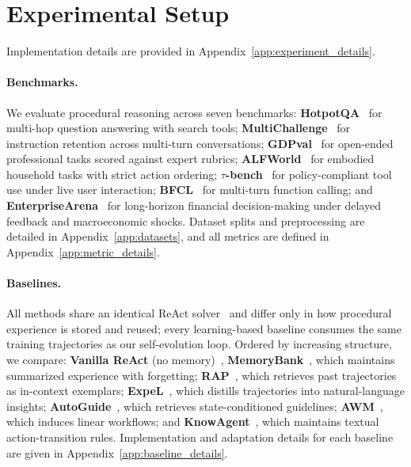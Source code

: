 \section{Experimental Setup}
\label{sec:experiments}

Implementation details are provided in Appendix~\ref{app:experiment_details}.

\paragraph{Benchmarks.} We evaluate procedural reasoning across seven benchmarks: \textbf{HotpotQA}~\citep{yang2018hotpotqa} for multi-hop question answering with search tools; \textbf{MultiChallenge}~\citep{deshpande2025multichallenge} for instruction retention across multi-turn conversations; \textbf{GDPval}~\citep{patwardhan2025gdpval} for open-ended professional tasks scored against expert rubrics; \textbf{ALFWorld}~\citep{shridharalfworld} for embodied household tasks with strict action ordering; \textbf{$\tau$-bench}~\citep{yao2024tau} for policy-compliant tool use under live user interaction; \textbf{BFCL}~\citep{patil2025berkeley} for multi-turn function calling; and \textbf{EnterpriseArena}~\citep{han2026can} for long-horizon financial decision-making under delayed feedback and macroeconomic shocks. Dataset splits and preprocessing are detailed in Appendix~\ref{app:datasets}, and all metrics are defined in Appendix~\ref{app:metric_details}.

\paragraph{Baselines.} All methods share an identical ReAct solver~\citep{yao2023react} and differ only in how procedural experience is stored and reused; every learning-based baseline consumes the same training trajectories as our self-evolution loop. Ordered by increasing structure, we compare: \textbf{Vanilla ReAct} (no memory)~\citep{yao2023react}, \textbf{MemoryBank}~\citep{zhong2024memorybank}, which maintains summarized experience with forgetting; \textbf{RAP}~\citep{kagaya2024rap}, which retrieves past trajectories as in-context exemplars; \textbf{ExpeL}~\citep{zhao2024expel}, which distills trajectories into natural-language insights; \textbf{AutoGuide}~\citep{fu2024autoguide}, which retrieves state-conditioned guidelines; \textbf{AWM}~\citep{wang2025agent}, which induces linear workflows; and \textbf{KnowAgent}~\citep{zhu2025knowagent}, which maintains textual action-transition rules. Implementation and adaptation details for each baseline are given in Appendix~\ref{app:baseline_details}.

